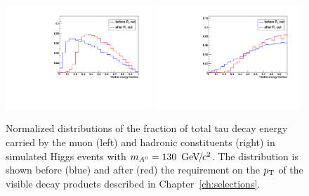 \begin{figure}[t]
\begin{center}
\includegraphics*[width=0.49\textwidth]{svfit_chapter/figures/scuplting_A130_muon.pdf}
\includegraphics*[width=0.49\textwidth]{svfit_chapter/figures/scuplting_A130_tau.pdf}
\caption[Effect of the visible \pt requirements on muon and hadronic $\tau$
decays]{\captiontext Normalized distributions of the fraction of total tau decay
energy carried by the muon (left) and hadronic constituents (right) in simulated
Higgs events with \mbox{$m_{A^0} = 130~{\,\text{Ge\hspace{-.08em}V\hspace{-0.16em}/\hspace{-0.08em}}c^\text{2}}$}.  The distribution is shown before
(blue) and after (red) the requirement on the $p_{\mathrm{T}}$ of the visible decay
products described in Chapter~\ref{ch:selections}.  }
\label{fig:ptBalancePtVisCuts}
\end{center}
\end{figure} 

